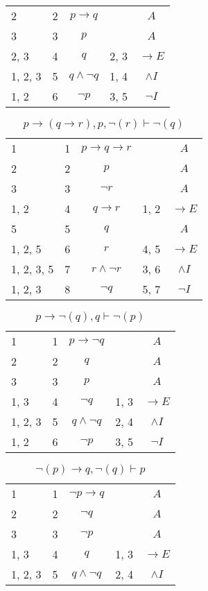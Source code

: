 \documentclass{article}
\begin{document}
\begin{table}[htbp]
\begin{tabular}{lrlll}
{2} & 2 & $$p→q$$ & {} & $$A$$ \\
{3} & 3 & $$p$$ & {} & $$A$$ \\
{2, 3} & 4 & $$q$$ & {2, 3} & $$→E$$ \\
{1, 2, 3} & 5 & $$q∧ ¬q$$ & {1, 4} & $$∧I$$ \\
{1, 2} & 6 & $$¬p$$ & {3, 5} & $$¬I$$ \\
\end{tabular}
\end{table}\begin{table}[htbp]\caption*{$p→(q→r),p,¬(r) ⊢ ¬(q)$}\centering\begin{tabular}{lrlll}
{1} & 1 & $$p→q→r$$ & {} & $$A$$ \\
{2} & 2 & $$p$$ & {} & $$A$$ \\
{3} & 3 & $$¬r$$ & {} & $$A$$ \\
{1, 2} & 4 & $$q→r$$ & {1, 2} & $$→E$$ \\
{5} & 5 & $$q$$ & {} & $$A$$ \\
{1, 2, 5} & 6 & $$r$$ & {4, 5} & $$→E$$ \\
{1, 2, 3, 5} & 7 & $$r∧ ¬r$$ & {3, 6} & $$∧I$$ \\
{1, 2, 3} & 8 & $$¬q$$ & {5, 7} & $$¬I$$ \\
\end{tabular}
\end{table}\begin{table}[htbp]\caption*{$p→ ¬(q),q ⊢ ¬(p)$}\centering\begin{tabular}{lrlll}
{1} & 1 & $$p→ ¬q$$ & {} & $$A$$ \\
{2} & 2 & $$q$$ & {} & $$A$$ \\
{3} & 3 & $$p$$ & {} & $$A$$ \\
{1, 3} & 4 & $$¬q$$ & {1, 3} & $$→E$$ \\
{1, 2, 3} & 5 & $$q∧ ¬q$$ & {2, 4} & $$∧I$$ \\
{1, 2} & 6 & $$¬p$$ & {3, 5} & $$¬I$$ \\
\end{tabular}
\end{table}\begin{table}[htbp]\caption*{$¬(p)→q,¬(q) ⊢ p$}\centering\begin{tabular}{lrlll}
{1} & 1 & $$¬p→q$$ & {} & $$A$$ \\
{2} & 2 & $$¬q$$ & {} & $$A$$ \\
{3} & 3 & $$¬p$$ & {} & $$A$$ \\
{1, 3} & 4 & $$q$$ & {1, 3} & $$→E$$ \\
{1, 2, 3} & 5 & $$q∧ ¬q$$ & {2, 4} & $$∧I$$ \\

\end{tabular}
\end{table}
\end{document}
